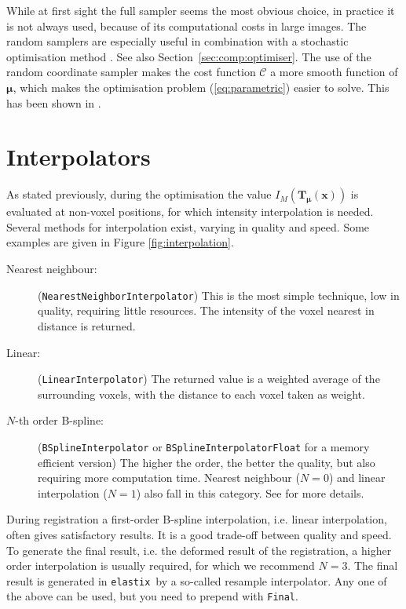 \documentclass[]{report}
\newcommand{\elastix}{\texttt{elastix}}
\newcommand{\vmu}{\bm{\mu}}
\newcommand{\vTmx}{\bm{T}_{\vmu}(\bm{x})}
\newcommand{\CC}{\mathcal{C}}
\begin{document}
While at first sight the full sampler seems the most obvious
choice, in practice it is not always used, because of its
computational costs in large images. The random samplers are
especially useful in combination with a stochastic optimisation
method \cite{KleinEA07}. See also
Section~\ref{sec:comp:optimiser}. The use of the random coordinate
sampler makes the cost function $\CC$ a more smooth function of
$\vmu$, which makes the optimisation problem (\ref{eq:parametric})
easier to solve. This has been shown in \cite{The08:Halton}.

\section{Interpolators}\label{sec:comp:interpolator}

As stated previously, during the optimisation the value $I_M(\vTmx)$
is evaluated at non-voxel positions, for which intensity
interpolation is needed. Several methods for interpolation exist,
varying in quality and speed. Some examples are given in Figure
\ref{fig:interpolation}.

\begin{description}
\item[Nearest neighbour:] (\texttt{NearestNeighborInterpolator}) This is the most simple technique, low in
quality, requiring little resources. The intensity of the voxel
nearest in distance is returned.

\item[Linear:] (\texttt{LinearInterpolator}) The returned value is a weighted
average of the surrounding voxels, with the distance to each voxel
taken as weight.

\item[$N$-th order B-spline:] (\texttt{BSplineInterpolator} or
\texttt{BSplineInterpolatorFloat} for a memory efficient version) The
higher the order, the better the quality, but also requiring more
computation time. Nearest neighbour ($N=0$) and linear interpolation
($N=1$) also fall in this category. See \citet{Unser99} for more
details.
\end{description}

During registration a first-order B-spline interpolation, i.e. linear
interpolation, often gives satisfactory results. It is a good
trade-off between quality and speed. To generate the final result,
i.e. the deformed result of the registration, a higher order
interpolation is usually required, for which we recommend $N=3$. The
final result is generated in \elastix\ by a so-called resample
interpolator. Any one of the above can be used, but you need to
prepend with \texttt{Final}.
\end{document}
